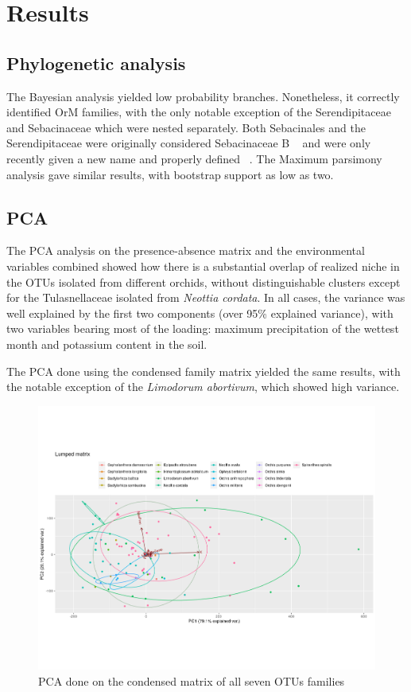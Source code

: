 \part{Results}
\label{results}

\chapter{Phylogenetic analysis}
\label{phylogeneticanalysis}

The Bayesian analysis yielded low probability branches. Nonetheless, it correctly identified OrM families, with the only notable exception of the Serendipitaceae and Sebacinaceae which were nested separately. Both Sebacinales and the Serendipitaceae were originally considered Sebacinaceae B ~\citep{weiss2004} and were only recently given a new name and properly defined ~\citep{weiss2016}.
The Maximum parsimony analysis gave similar results, with bootstrap support as low as two.

\chapter{PCA}
\label{pca}

The PCA analysis on the presence-absence matrix and the environmental variables combined showed how there is a substantial overlap of realized niche in the OTUs isolated from different orchids, without distinguishable clusters except for the Tulasnellaceae isolated from \emph{Neottia cordata}.
In all cases, the variance was well explained by the first two components (over 95\% explained variance), with two variables bearing most of the loading: maximum precipitation of the wettest month and potassium content in the soil.

The PCA done using the condensed family matrix yielded the same results, with the notable exception of the \emph{Limodorum abortivum}, which showed high variance.

\begin{figure}[htbp]
\centering
\includegraphics[keepaspectratio,width=\textwidth,height=0.75\textheight]{images/lumpPCA.png}
\caption{PCA done on the condensed matrix of all seven OTUs families}
\end{figure}


